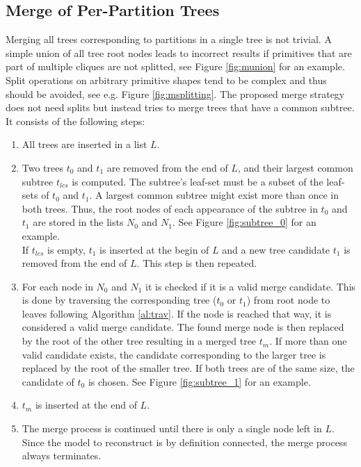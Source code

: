 \subsection{Merge of Per-Partition Trees}
Merging all trees corresponding to partitions in a single tree is not trivial. 
A simple union of all tree root nodes leads to incorrect results if primitives that are part of multiple cliques are not splitted, see Figure \ref{fig:munion} for an example.
Split operations on arbitrary primitive shapes tend to be complex and thus should be avoided, see e.g. Figure \ref{fig:msplitting}.  
The proposed merge strategy does not need splits but instead tries to merge trees that have a common subtree.
It consists of the following steps:
\begin{enumerate}
	\item All trees are inserted in a list $L$. 
	\item Two trees $t_0$ and $t_1$ are removed from the end of $L$, and their largest common subtree $t_{lcs}$ is computed. The subtree's leaf-set must be a subset of the leaf-sets of $t_0$ and $t_1$. 
	A largest common subtree might exist more than once in both trees.
	Thus, the root nodes of each appearance of the subtree in $t_0$ and $t_1$ are stored in the lists $N_0$ and $N_1$.
	See Figure \ref{fig:subtree_0} for an example.
	  \\	
	If $t_{lcs}$ is empty, $t_1$ is inserted at the begin of $L$ and a new tree candidate $t_1$ is removed from the end of $L$. This step is then repeated.
	\item For each node in $N_0$ and $N_1$ it is checked if it is a valid merge candidate.
	This is done by traversing the corresponding tree ($t_0$ or $t_1$) from root node to leaves following Algorithm \ref{al:trav}.
	If the node is reached that way, it is considered a valid merge candidate.
	The found merge node is then replaced by the root of the other tree resulting in a merged tree $t_m$.
	If more than one valid candidate exists, the candidate corresponding to the larger tree is replaced by the root of the smaller tree.
	If both trees are of the same size, the candidate of $t_0$ is chosen.  
	See Figure \ref{fig:subtree_1} for an example.
	\item $t_m$ is inserted at the end of $L$.
	\item The merge process is continued until there is only a single node left in $L$.
	Since the model to reconstruct is by definition connected, the merge process always terminates.
\end{enumerate}

